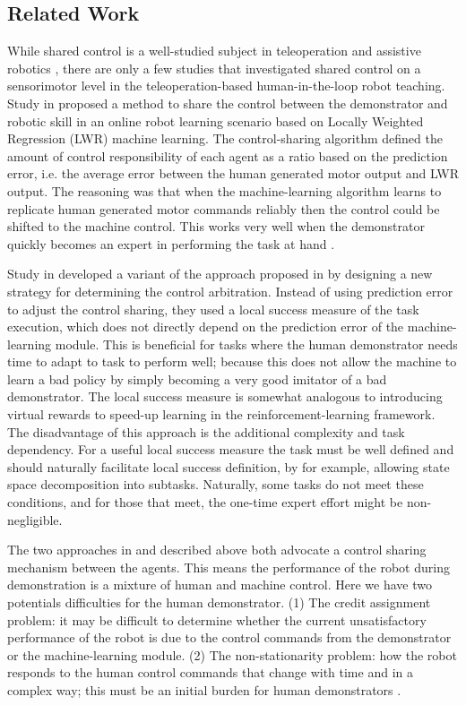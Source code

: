 \subsection{Related Work}
\label{sec:related}
While shared control is a well-studied subject in teleoperation \cite{Niemeyer2008,Dragan2013} and assistive robotics \cite{Omalley2006,Dragan2013,Jain2015,Peternel2016}, there are only a few studies that investigated shared control on a sensorimotor level in the teleoperation-based human-in-the-loop robot teaching. Study in \cite{Peternel2013b} proposed a method to share the control between the demonstrator and robotic skill in an online robot learning scenario based on Locally Weighted Regression (LWR) \cite{Schaal1998,Vijayakumar2005} machine learning. The control-sharing algorithm defined the amount of control responsibility of each agent as a ratio based on the prediction error, i.e. the average error between the human generated motor output and LWR output. The reasoning was that when the machine-learning algorithm learns to replicate human generated motor commands reliably then the control could be shifted to the machine control. This works very well when the demonstrator quickly becomes an expert in performing the task at hand \cite{Peternel2013b}.

Study in \cite{Zamani2015} developed a variant of the approach proposed in \cite{Peternel2013b} by designing a new strategy for determining the control arbitration. Instead of using prediction error to adjust the control sharing, they used a local success measure of the task execution, which does not directly depend on the prediction error of the machine-learning module. This is beneficial for tasks where the human demonstrator needs time to adapt to task to perform well; because this does not allow the machine to learn a bad policy by simply becoming a very good imitator of a bad demonstrator. The local success measure is somewhat analogous to introducing virtual rewards to speed-up learning in the reinforcement-learning framework. The disadvantage of this approach is the additional complexity and task dependency. For a useful local success measure the task must be well defined and should naturally facilitate local success definition, by for example, allowing state space decomposition into subtasks. Naturally, some tasks do not meet these conditions, and for those that meet, the one-time expert effort might be non-negligible.

The two approaches in \cite{Peternel2013b} and \cite{Zamani2015} described above both advocate a control sharing mechanism between the agents. This means the performance of the robot during demonstration is a mixture of human and machine control. Here we have two potentials difficulties for the human demonstrator. (1) The credit assignment problem: it may be difficult to determine whether the current unsatisfactory performance of the robot is due to the control commands from the demonstrator or the machine-learning module. (2) The non-stationarity problem: how the robot responds to the human control commands that change with time and in a complex way; this must be an initial burden for human demonstrators \cite{Zamani2015}.

